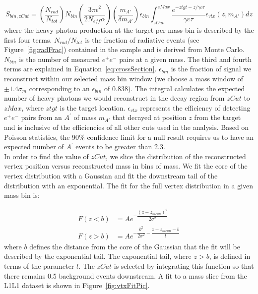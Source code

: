 \begin{equation}
\label{eq:signal}
S_{bin,zCut} = \left( \dfrac{N_{rad}}{N_{tot}}\right) N_{bin}\left(\dfrac{3\pi\epsilon^{2}}{2N_{eff}\alpha}\right)\left(\dfrac{m_{A'}}{\delta m_{A'}}\right)\epsilon_{bin}\int_{zCut}^{zMax}\dfrac{e^{-ztgt-z/\gamma c\tau}}{\gamma c \tau}\epsilon_{vtx}(z,m_{A'})dz
\end{equation}
where the heavy photon production at the target per mass bin is described by the first four terms.  $N_{rad}/N_{tot}$ is the fraction of radiative events (see Figure~\ref{fig:radFrac}) contained in the sample and is derived from Monte Carlo. $N_{bin}$ is the number of measured $e^+e^-$ pairs at a given mass. The third and fourth terms are explained in Equation~\eqref{eq:crossSection}. $\epsilon_{bin}$ is the fraction of signal we reconstruct within our selected mass bin window (we choose a mass window of $\pm1.4\sigma_m$ corresponding to an $\epsilon_{bin}$ of 0.838). The integral calculates the expected number of heavy photons we would reconstruct in the decay region from $zCut$ to $zMax$, where $ztgt$ is the target location. $\epsilon_{vtx}$ represents the efficiency of detecting $e^+e^-$ pairs from an $A^{\prime}$ of mass $m_{A'}$ that decayed at position $z$ from the target and is inclusive of the efficiencies of all other cuts used in the analysis. Based on Poisson statistics, the 90$\%$ confidence limit for a null result requires us to have an expected number of $A^{\prime}$ events to be greater than 2.3.\\
\indent In order to find the value of $zCut$, we slice the distribution of the reconstructed vertex position versus reconstructed mass in bins of mass. We fit the core of the vertex distribution with a Gaussian and fit the downstream tail of the distribution with an exponential. The fit for the full vertex distribution in a given mass bin is:

\begin{equation}
\label{eq:vtxFit}
\begin{split}
F(z < b) & =  Ae^{-\dfrac{(z-z_{mean})^2}{2\sigma^2}}\\
F(z > b) & =  Ae^{-\dfrac{b^2}{2\sigma^2}-\dfrac{z-z_{mean}-b}{l}}
\end{split}
\end{equation}
where $b$ defines the distance from the core of the Gaussian that the fit will be described by the exponential tail. The exponential tail, where $z>b$, is defined in terms of the parameter $l$. The $zCut$ is selected by integrating this function so that there remains 0.5 background events downstream. A fit to a mass slice from the L1L1 dataset is shown in Figure~\ref{fig:vtxFitPic}.

